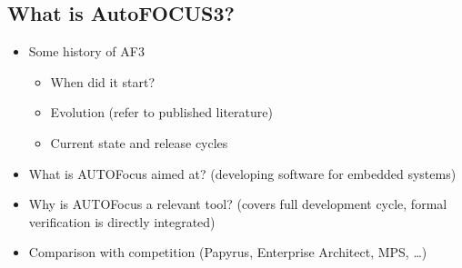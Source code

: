 \subsection{What is AutoFOCUS3?}

\begin{itemize}
  \item Some history of AF3
  \begin{itemize}
    \item When did it start?
    \item Evolution (refer to published literature)
    \item Current state and release cycles
  \end{itemize}
  \item What is AUTOFocus aimed at? (developing software for embedded systems)
  \item Why is AUTOFocus a relevant tool? (covers full development cycle, formal
  verification is directly integrated)
  \item Comparison with competition (Papyrus, Enterprise Architect, MPS, \ldots)
\end{itemize}
